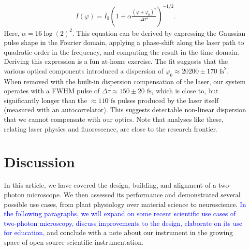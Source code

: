 \documentclass[10pt,letterpaper]{article}
\begin{document}
\begin{eqnarray}
    I(\varphi) =I_0 \left(1+\alpha\frac{(\varphi+\varphi_0)^2}{\Delta\tau^4}\right)^{-1/2}.
\end{eqnarray}
Here, $\alpha=16\log(2)^2$. This equation can be derived by expressing the Gaussian pulse shape in the Fourier domain, applying a phase-shift along the laser path to quadratic order in the frequency, and computing the result in the time domain. Deriving this expression is a fun at-home exercise. The fit suggests that the various optical components introduced a dispersion of $\varphi_0\approx20200\pm170\text{ fs}^2$. When removed with the built-in dispersion compensation of the laser, our system operates with a FWHM pulse of $\Delta\tau \approx 150\pm20\text{ fs}$, which is close to, but significantly longer than the $\approx110\text{ fs}$ pulses produced by the laser itself (measured with an autocorrelator). This suggests detectable non-linear dispersion that we cannot compensate with our optics. Note that analyses like these, relating laser physics and fluorescence, are close to the research frontier\cite{Piazza2016,Saidi2023}.

\section*{Discussion}

In this article, we have covered the design, building, and alignment of a two-photon microscope. We then assessed its performance and demonstrated several possible use cases, from plant physiology over material science to neuroscience. \textcolor{blue}{In the following paragraphs, we will expand on some recent scientific use cases of two-photon microscopy, discuss improvements to the design, elaborate on its use for education,} and conclude with a note about our instrument in the growing space of open source scientific instrumentation.
\end{document}
